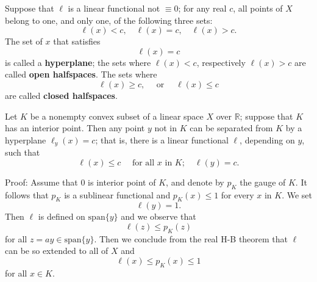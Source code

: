 \documentclass[12pt, oneside]{book}
\begin{document}
\begin{definition}
    Suppose that $\ell$ is a linear functional not $\equiv 0$; for any real $c$, all points of $X$ belong to one, and only one, of the following three sets:
    \begin{equation*}
        \ell(x)<c, \quad \ell(x)=c, \quad \ell(x)>c .
    \end{equation*}
    The set of $x$ that satisfies
    \begin{equation*}
        \ell(x)=c
    \end{equation*}
    is called a \textbf{hyperplane}; the sets where $\ell(x)<c$, respectively $\ell(x)>c$ are called \textbf{open halfspaces}. The sets where
    \begin{equation*}
        \ell(x) \geq c, \quad \text { or } \quad \ell(x) \leq c
    \end{equation*}
    are called \textbf{closed halfspaces}.

\end{definition}
\begin{theorem}
    Let $K$ be a nonempty convex subset of a linear space $X$ over $\mathbb{R}$;
    suppose that $K$ has an interior point.
    Then any point $y$ not in $K$ can be separated from $K$ by a hyperplane $\ell_y(x)=c$; that is, there is a linear functional $\ell$, depending on $y$, such that
    \begin{equation*}
        \ell(x)\leq c \quad \text { for all } x \text { in } K ; \quad \ell(y)=c .
    \end{equation*}

    Proof:
    Assume that $0$ is interior point of $ K$, and denote by $p_K$ the gauge of $K$. It follows that $p_K$ is a sublinear functional and $p_K(x)\leq 1$ for every $x$ in $K$. We set
    \begin{equation*}
        \ell(y)=1.
    \end{equation*}
    Then $\ell$ is defined on $\mathrm{span}\{y\}$ and we observe that
    \begin{equation*}
        \ell(z) \leq p_K(z)
    \end{equation*}
    for all $z=ay \in \mathrm{span}\{y\}$.
    Then we conclude from the real H-B theorem that $\ell$ can be so extended to all of $X$ and
    \begin{equation*}
        \ell(x)
        \leq
        p_K(x)
        \leq
        1
    \end{equation*}
    for all $x\in K$.
\end{theorem}
\end{document}
